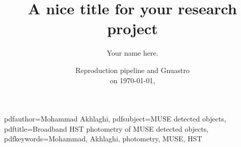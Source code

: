 


\usepackage[a4paper, includeheadfoot, body={18.7cm, 24.5cm}]{geometry}




\setlength{\columnsep}{0.75cm}





\renewcommand{\topfraction}{.99}
\renewcommand{\bottomfraction}{.7}
\renewcommand{\textfraction}{.05}
\renewcommand{\floatpagefraction}{.99}
\renewcommand{\dbltopfraction}{.99}
\renewcommand{\dblfloatpagefraction}{.99}
\setcounter{topnumber}{1}
\setcounter{bottomnumber}{0}
\setcounter{totalnumber}{2}
\setcounter{dbltopnumber}{1}



\usepackage{xcolor}
\color{black}                   %


\usepackage{fixltx2e}



\usepackage{setspace, caption}
\setlength{\abovecaptionskip}{3pt plus 1pt minus 1pt}



\usepackage[hang]{footmisc}
\setlength\footnotemargin{10pt}



\usepackage{datetime}



\usepackage[
  colorlinks,
  urlcolor=blue,
  citecolor=blue,
  linkcolor=blue,
  linktocpage]{hyperref}
\renewcommand\UrlFont{\rmfamily}



\hypersetup
{
    pdfauthor={Mohammad Akhlaghi},
    pdfsubject={MUSE detected objects},
    pdftitle={Broadband HST photometry of MUSE detected objects},
    pdfkeywords={Mohammad, Akhlaghi, photometry, MUSE, HST}
}



\title{A nice title for your research project}
\date{\small Reproduction pipeline \pipelineversion{}
      and Gnuastro \gnuastroversion\\on \today, \currenttime}
\author{Your name here.}
